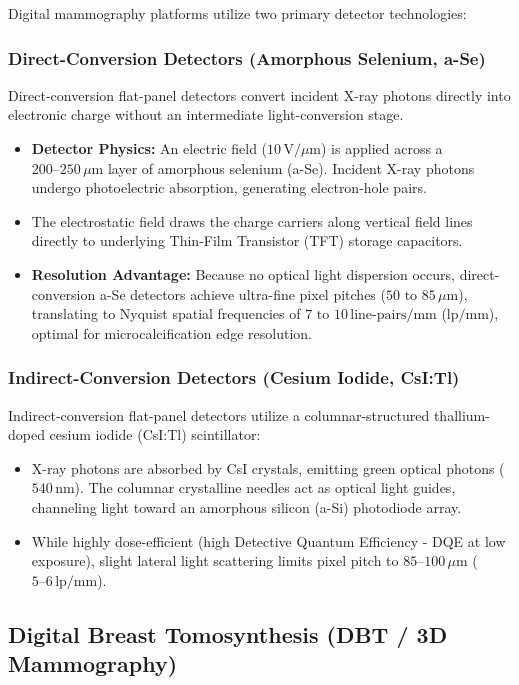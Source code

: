 \documentclass[11pt,a4paper]{article}
\begin{document}
Digital mammography platforms utilize two primary detector technologies:

\subsubsection{Direct-Conversion Detectors (Amorphous Selenium, a-Se)}
Direct-conversion flat-panel detectors convert incident X-ray photons directly into electronic charge without an intermediate light-conversion stage.
\begin{itemize}[leftmargin=*]
    \item \textbf{Detector Physics:} An electric field ($10\,\text{V/}\mu\text{m}$) is applied across a $200\text{--}250\,\mu\text{m}$ layer of amorphous selenium (a-Se). Incident X-ray photons undergo photoelectric absorption, generating electron-hole pairs.
    \item The electrostatic field draws the charge carriers along vertical field lines directly to underlying Thin-Film Transistor (TFT) storage capacitors.
    \item \textbf{Resolution Advantage:} Because no optical light dispersion occurs, direct-conversion a-Se detectors achieve ultra-fine pixel pitches ($50\text{ to }85\,\mu\text{m}$), translating to Nyquist spatial frequencies of $7\text{ to }10\,\text{line-pairs/mm}$ ($\text{lp/mm}$), optimal for microcalcification edge resolution.
\end{itemize}

\subsubsection{Indirect-Conversion Detectors (Cesium Iodide, CsI:Tl)}
Indirect-conversion flat-panel detectors utilize a columnar-structured thallium-doped cesium iodide (CsI:Tl) scintillator:
\begin{itemize}[leftmargin=*]
    \item X-ray photons are absorbed by CsI crystals, emitting green optical photons ($540\,\text{nm}$). The columnar crystalline needles act as optical light guides, channeling light toward an amorphous silicon (a-Si) photodiode array.
    \item While highly dose-efficient (high Detective Quantum Efficiency - DQE at low exposure), slight lateral light scattering limits pixel pitch to $85\text{--}100\,\mu\text{m}$ ($5\text{--}6\,\text{lp/mm}$).
\end{itemize}

\subsection{Digital Breast Tomosynthesis (DBT / 3D Mammography)}
\end{document}
